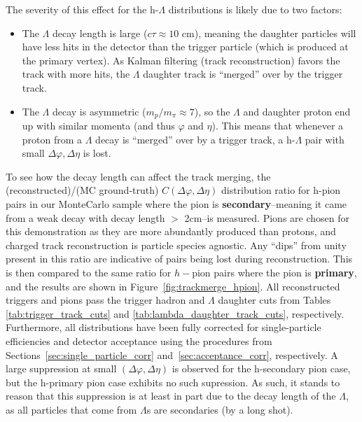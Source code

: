 The severity of this effect for the h-$\Lambda$ distributions is likely due to two factors:
%
\begin{itemize}
\item The $\Lambda$ decay length is large ($c\tau \approx 10$ cm), meaning the daughter particles will have less hits in the detector than the trigger particle (which is produced at the primary vertex). As Kalman filtering (track reconstruction) favors the track with more hits, the $\Lambda$ daughter track is ``merged'' over by the trigger track.
\item The $\Lambda$ decay is asymmetric ($m_{p}/m_{\pi} \approx 7$), so the $\Lambda$ and daughter proton end up with similar momenta (and thus $\varphi$ and $\eta$). This means that whenever a proton from a $\Lambda$ decay is ``merged'' over by a trigger track, a h-$\Lambda$ pair with small $\Delta\varphi, \Delta\eta$ is lost.
\end{itemize}
%
To see how the decay length can affect the track merging, the (reconstructed)/(MC ground-truth) $C(\Delta\varphi, \Delta\eta)$ distribution ratio for h-pion pairs in our MonteCarlo sample where the pion is \textbf{secondary}--meaning it came from a weak decay with decay length $>$ 2cm--is measured. Pions are chosen for this demonstration as they are more abundantly produced than protons, and charged track reconstruction is particle species agnostic. Any ``dips'' from unity present in this ratio are indicative of pairs being lost during reconstruction. This is then compared to the same ratio for $h-$pion pairs where the pion is \textbf{primary}, and the results are shown in Figure~\ref{fig:trackmerge_hpion}. All reconstructed triggers and pions pass the trigger hadron and $\Lambda$ daughter cuts from Tables \ref{tab:trigger_track_cuts} and \ref{tab:lambda_daughter_track_cuts}, respectively. Furthermore, all distributions have been fully corrected for single-particle efficiencies and detector acceptance using the procedures from Sections~\ref{sec:single_particle_corr} and~\ref{sec:acceptance_corr}, respectively. A large suppression at small $(\Delta\varphi, \Delta\eta)$ is observed for the h-secondary pion case, but the h-primary pion case exhibits no such supression. As such, it stands to reason that this suppression is at least in part due to the decay length of the $\Lambda$, as all particles that come from $\Lambda$s are secondaries (by a long shot).

